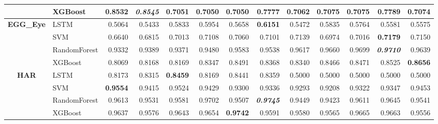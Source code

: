 \begin{table}[H]
\begin{adjustbox}{max width=12cm}
\begin{tabular}{|c|l|r|r|r|r|r|r|r|r|r|r|r|}
			                      & XGBoost      & 0.8532                   & \textit{\textbf{0.8545}} & 0.7051          & 0.7050 & 0.7050          & 0.7777                   & 0.7062                   & 0.7075                   & 0.7075 & 0.7789                   & 0.7074          \\
			\hline
			\textbf{EGG\_Eye}     & LSTM         & 0.5064                   & 0.5433                   & 0.5833          & 0.5954 & 0.5658          & \textbf{0.6151}          & 0.5472                   & 0.5835                   & 0.5764 & 0.5581                   & 0.5575          \\
			                      & SVM          & 0.6640                   & 0.6815                   & 0.7013          & 0.7108 & 0.7060          & 0.7101                   & 0.7139                   & 0.6974                   & 0.7016 & \textbf{0.7179}          & 0.7150          \\
			                      & RandomForest & 0.9332                   & 0.9389                   & 0.9371          & 0.9480 & 0.9583          & 0.9538                   & 0.9617                   & 0.9660                   & 0.9699 & \textit{\textbf{0.9710}} & 0.9639          \\
			                      & XGBoost      & 0.8069                   & 0.8168                   & 0.8169          & 0.8347 & 0.8491          & 0.8368                   & 0.8340                   & 0.8466                   & 0.8471 & 0.8525                   & \textbf{0.8656} \\
			\hline
			\textbf{HAR}          & LSTM         & 0.8173                   & 0.8315                   & \textbf{0.8459} & 0.8169 & 0.8441          & 0.8359                   & 0.5000                   & 0.5000                   & 0.5000 & 0.5000                   & 0.5000          \\
			                      & SVM          & \textbf{0.9554}          & 0.9415                   & 0.9524          & 0.9429 & 0.9300          & 0.9336                   & 0.9293                   & 0.9208                   & 0.9322 & 0.9347                   & 0.9453          \\
			                      & RandomForest & 0.9613                   & 0.9531                   & 0.9581          & 0.9702 & 0.9507          & \textit{\textbf{0.9745}} & 0.9449                   & 0.9423                   & 0.9611 & 0.9645                   & 0.9541          \\
			                      & XGBoost      & 0.9637                   & 0.9576                   & 0.9643          & 0.9654 & \textbf{0.9742} & 0.9591                   & 0.9580                   & 0.9565                   & 0.9665 & 0.9663                   & 0.9556          \\

\end{tabular}
\end{adjustbox}
\end{table}
